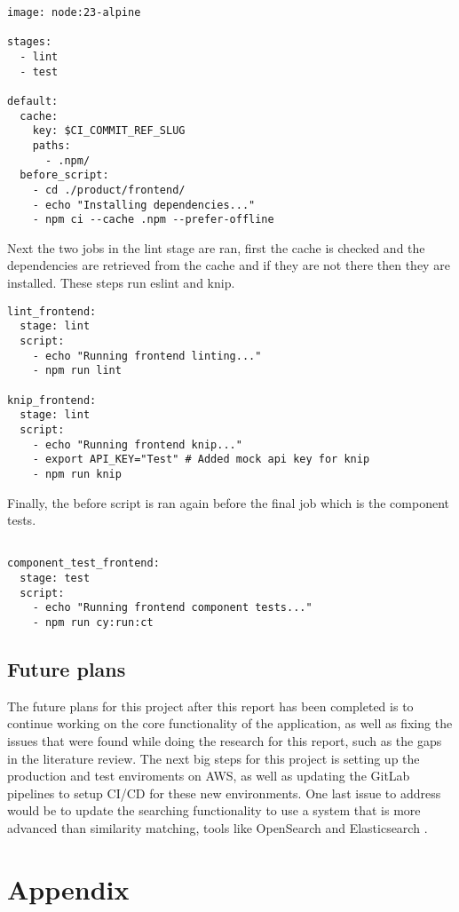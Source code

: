 \documentclass[]{project_report}
\begin{document}
\begin{verbatim}
image: node:23-alpine

stages:
  - lint
  - test

default:
  cache:
    key: $CI_COMMIT_REF_SLUG
    paths:
      - .npm/
  before_script:
    - cd ./product/frontend/
    - echo "Installing dependencies..."
    - npm ci --cache .npm --prefer-offline

\end{verbatim}
Next the two jobs in the lint stage are ran, first the cache is checked and the dependencies are retrieved from the cache and if they are not there then they are installed. These steps run eslint and knip.
\begin{verbatim}
lint_frontend:
  stage: lint
  script:
    - echo "Running frontend linting..."
    - npm run lint

knip_frontend:
  stage: lint
  script:
    - echo "Running frontend knip..."
    - export API_KEY="Test" # Added mock api key for knip
    - npm run knip

\end{verbatim}
Finally, the before script is ran again before the final job which is the component tests. 
\begin{verbatim}

component_test_frontend:
  stage: test
  script:
    - echo "Running frontend component tests..."
    - npm run cy:run:ct
\end{verbatim}

\section{Future plans}

The future plans for this project after this report has been completed is to continue working on the core functionality of the application, as well as fixing the issues that were found while doing the research for this report, such as the gaps in the literature review. The next big steps for this project is setting up the production and test enviroments on AWS, as well as updating the GitLab pipelines to setup CI/CD for these new environments. One last issue to address would be to update the searching functionality to use a system that is more advanced than similarity matching, tools like OpenSearch and Elasticsearch .




\chapter*{Appendix}


\appendix
\end{document}

